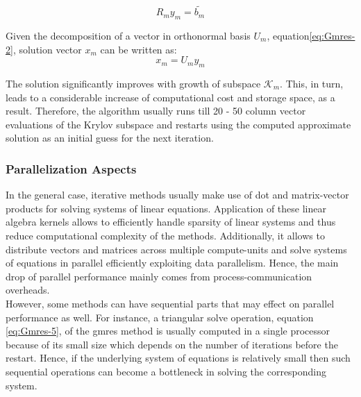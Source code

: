 \begin{equation} \label{eq:Gmres-5}
	R_m y_{m} = \tilde{b_m}
\end{equation}

Given the decomposition of a vector in orthonormal basis $U_{m}$, equation\ref{eq:Gmres-2}, solution vector $x_{m}$ can be written as:\\

\begin{equation} \label{eq:Gmres-6}
	x_m = U_m y_{m}  
\end{equation}


The solution significantly improves with growth of subspace $\mathcal{K}_{m}$. This, in turn, leads to a considerable increase of computational cost and storage space, as a result. Therefore, the algorithm usually runs till 20 - 50 column vector evaluations of the Krylov subspace and restarts using the computed approximate solution as an initial guess for the next iteration.\\


\subsubsection{Parallelization Aspects}
\label{subseq:iterative-parallel-aspects}


In the general case, iterative methods usually make use of dot and matrix-vector products for solving systems of linear equations. Application of these linear algebra kernels allows to efficiently handle sparsity of linear systems and thus reduce computational complexity of the methods. Additionally, it allows to distribute vectors and matrices across multiple compute-units and solve systems of equations in parallel efficiently exploiting data parallelism. Hence, the main drop of parallel performance mainly comes from process-communication overheads.\\


However, some methods can have sequential parts that may effect on parallel performance as well. For instance, a triangular solve operation,  equation \ref{eq:Gmres-5}, of the \acrshort{gmres} method is usually computed in a single processor because of its small size which depends on the number of iterations before the restart. Hence, if the underlying system of equations is relatively small then such sequential operations can become a bottleneck in solving the corresponding system.\\





